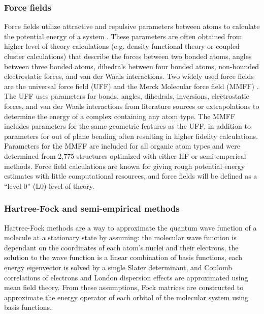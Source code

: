 \documentclass[preprint, 11pt]{elsarticle} %
\begin{document}
\subsubsection{Force fields}

Force fields utilize attractive and repulsive parameters between atoms to calculate the potential energy of a system \cite{gonzalez:2011}. 
These parameters are often obtained from higher level of theory calculations (e.g. density functional theory or coupled cluster calculations) that describe the forces between two bonded atoms, angles between three bonded atoms, dihedrals between four bonded atoms, non-bounded electrostatic forces, and van der Waals interactions.
Two widely used force fields are the universal force field (UFF) \cite{UFF:1992} and the Merck Molecular force field (MMFF) \cite{MMFF94:1996}.
The UFF uses parameters for bonds, angles, dihedrals, inversions, electrostatic forces, and van der Waals interactions from literature sources or extrapolations to determine the energy of a complex containing any atom type.
The MMFF includes parameters for the same geometric features as the UFF, in addition to parameters for out of plane bending often resulting in higher fidelity calculations. 
Parameters for the MMFF are included for all organic atom types and were determined from 2,775 structures optimized with either HF or semi-emperical methods.
Force field calculations are known for giving rough potential energy estimates with little computational resources, and force fields will be defined as a ``level 0'' (L0) level of theory.

\subsubsection{Hartree-Fock and semi-empirical methods}

Hartree-Fock methods are a way to approximate the quantum wave function of a molecule at a stationary state \cite{HF:1951, HF:1987} by assuming: the molecular wave function is dependant on the coordinates of each atom's nuclei and their electrons, the solution to the wave function is a linear combination of basis functions, each energy eigenvector is solved by a single Slater determinant, and Coulomb correlations of electrons and London dispersion effects are approximated using mean field theory.
From these assumptions, Fock matrices are constructed to approximate the energy operator of each orbital of the molecular system using basis functions.
\end{document}
